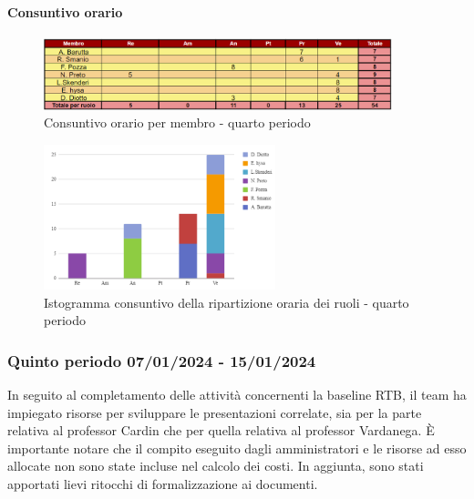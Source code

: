 \paragraph*{Consuntivo orario } \hspace{1pt}

\begin{figure}[H]
    \centering
    \includegraphics[width=0.9\textwidth]{../Images/consuntivoOrario4Periodo.png}
    \caption{Consuntivo orario per membro - quarto periodo}
    \label{fig:Constuntivo_orario_4}
\end{figure}

\begin{figure}[H]
    \centering
    \includegraphics[width=0.6\textwidth]{../Images/consuntivoDivisioneRuoli4Periodo.png}
    \caption{Istogramma consuntivo della ripartizione oraria dei ruoli - quarto periodo}
    \label{fig:Consuntivo_ripartizione_oraria_4}
\end{figure}



\subsubsection{Quinto periodo  07/01/2024 - 15/01/2024}
In seguito al completamento delle attività concernenti la baseline RTB, il team ha impiegato risorse per sviluppare le presentazioni correlate, sia per la parte relativa al professor Cardin che per quella relativa al professor Vardanega.
È importante notare che il compito eseguito dagli amministratori e le risorse ad esso allocate non sono state incluse nel calcolo dei costi. 
In aggiunta, sono stati apportati lievi ritocchi di formalizzazione ai documenti.

